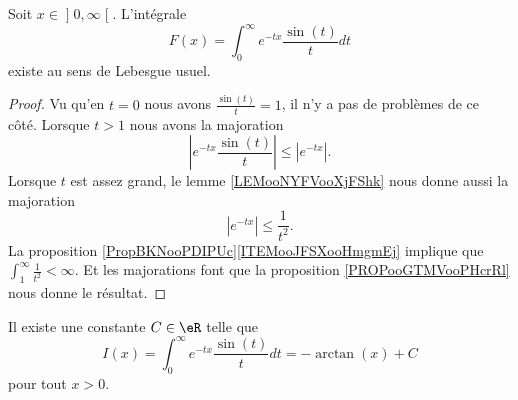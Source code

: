 \begin{lemma}       \label{LEMooARPIooDPSGwR}
	Soit \( x\in \mathopen] 0 , \infty \mathclose[\). L'intégrale
	\begin{equation}
		F(x)=\int_0^{\infty} e^{-tx}\frac{ \sin(t) }{ t }dt
	\end{equation}
	existe au sens de Lebesgue usuel.
\end{lemma}

\begin{proof}
	Vu qu'en \( t=0\) nous avons \( \frac{ \sin(t) }{ t }=1\), il n'y a pas de problèmes de ce côté. Lorsque \( t>1\) nous avons la majoration
	\begin{equation}
		|  e^{-tx}\frac{ \sin(t) }{ t } |\leq |  e^{-tx} |.
	\end{equation}
	Lorsque \( t\) est assez grand, le lemme \ref{LEMooNYFVooXjFShk} nous donne aussi la majoration
	\begin{equation}
		|  e^{-tx} |\leq \frac{1}{ t^2 }.
	\end{equation}
	La proposition \ref{PropBKNooPDIPUc}\ref{ITEMooJFSXooHmgmEj} implique que \( \int_1^{\infty}\frac{1}{ t^2 }<\infty\). Et les majorations font que la proposition \ref{PROPooGTMVooPHcrRl} nous donne le résultat.
\end{proof}

\begin{lemma}     \label{LEMooRDCSooBrWmep}
	Il existe une constante \( C\in \eR\) telle que
	\begin{equation}
		I(x)=\int_0^{\infty} e^{-tx}\frac{ \sin(t) }{ t }dt=-\arctan(x)+C
	\end{equation}
	pour tout \( x>0\).
\end{lemma}

